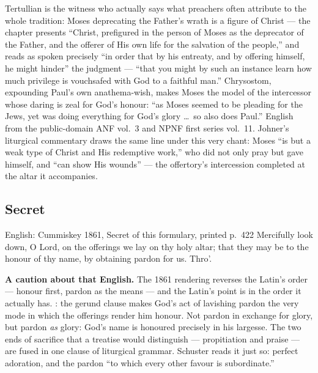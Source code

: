 \begin{witnessnote}
Tertullian is the witness who actually says what preachers often attribute
to the whole tradition: Moses deprecating the Father's wrath is a figure of
Christ --- the chapter presents ``Christ, prefigured in the person of Moses
as the deprecator of the Father, and the offerer of His own life for the
salvation of the people,'' and reads  as spoken precisely
``in order that by his entreaty, and by offering himself, he might hinder''
the judgment --- ``that you might by such an instance learn how much
privilege is vouchsafed with God to a faithful man.'' Chrysostom, expounding
Paul's own anathema-wish, makes Moses the model of the intercessor whose
daring is zeal for God's honour: ``as Moses seemed to be pleading for the
Jews, yet was doing everything for God's glory \dots\ so also does Paul.''
English from the public-domain ANF vol.~3 and NPNF first series vol.~11.
Johner's liturgical commentary draws the same line under this very chant:
Moses ``is but a weak type of Christ and His redemptive work,'' who did not
only pray but gave himself, and ``can show His wounds'' --- the offertory's
intercession completed at the altar it accompanies.
\end{witnessnote}

\elementguard
\subsection*{Secret }


\begin{namedtranslation}{English: Cummiskey 1861, Secret of this formulary, printed p.~422}
Mercifully look down, O Lord, on the offerings we lay on thy holy altar; that
they may be to the honour of thy name, by obtaining pardon for us. Thro'.
\end{namedtranslation}

\textbf{A caution about that English.} The 1861 rendering reverses the
Latin's order --- honour first, pardon as the means --- and the Latin's point
is in the order it actually has. : the gerund clause makes God's act of lavishing
pardon the very mode in which the offerings render him honour. Not pardon
in exchange for glory, but pardon \textit{as} glory: God's name is honoured
precisely in his largesse. The two ends of sacrifice that a treatise would
distinguish --- propitiation and praise --- are fused in one clause of
liturgical grammar. Schuster reads it just so: perfect adoration, and the
pardon ``to which every other favour is subordinate.''

